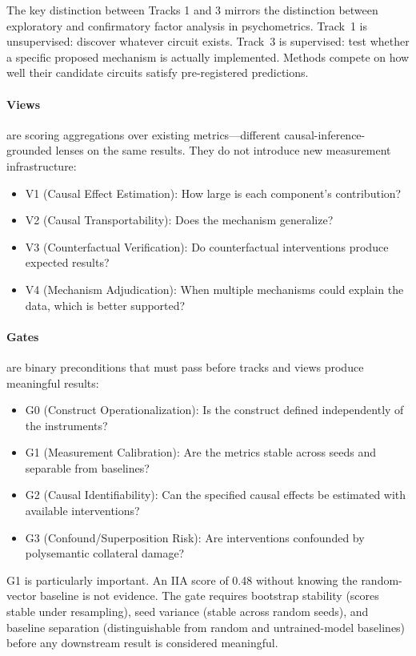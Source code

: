 \documentclass[10pt]{article}
\begin{document}
The key distinction between Tracks 1 and 3 mirrors the distinction between exploratory and confirmatory factor analysis in psychometrics. Track~1 is unsupervised: discover whatever circuit exists. Track~3 is supervised: test whether a specific proposed mechanism is actually implemented. Methods compete on how well their candidate circuits satisfy pre-registered predictions.

\paragraph{Views} are scoring aggregations over existing metrics---different causal-inference-grounded lenses on the same results. They do not introduce new measurement infrastructure:
\begin{itemize}[nosep]
    \item V1 (Causal Effect Estimation): How large is each component's contribution?
    \item V2 (Causal Transportability): Does the mechanism generalize?
    \item V3 (Counterfactual Verification): Do counterfactual interventions produce expected results?
    \item V4 (Mechanism Adjudication): When multiple mechanisms could explain the data, which is better supported?
\end{itemize}

\paragraph{Gates} are binary preconditions that must pass before tracks and views produce meaningful results:
\begin{itemize}[nosep]
    \item G0 (Construct Operationalization): Is the construct defined independently of the instruments?
    \item G1 (Measurement Calibration): Are the metrics stable across seeds and separable from baselines?
    \item G2 (Causal Identifiability): Can the specified causal effects be estimated with available interventions?
    \item G3 (Confound/Superposition Risk): Are interventions confounded by polysemantic collateral damage?
\end{itemize}

G1 is particularly important. An IIA score of 0.48 without knowing the random-vector baseline is not evidence. The gate requires bootstrap stability (scores stable under resampling), seed variance (stable across random seeds), and baseline separation (distinguishable from random and untrained-model baselines) before any downstream result is considered meaningful.
\end{document}
